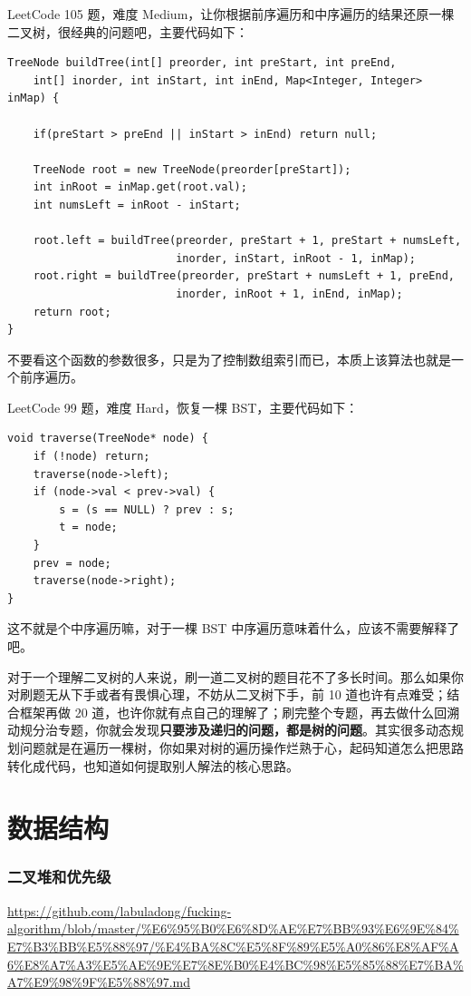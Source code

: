 \documentclass[12pt]{article}
\begin{document}
LeetCode 105 题，难度 Medium，让你根据前序遍历和中序遍历的结果还原一棵二叉树，很经典的问题吧，主要代码如下：
\begin{lstlisting}
TreeNode buildTree(int[] preorder, int preStart, int preEnd, 
    int[] inorder, int inStart, int inEnd, Map<Integer, Integer> inMap) {

    if(preStart > preEnd || inStart > inEnd) return null;

    TreeNode root = new TreeNode(preorder[preStart]);
    int inRoot = inMap.get(root.val);
    int numsLeft = inRoot - inStart;

    root.left = buildTree(preorder, preStart + 1, preStart + numsLeft, 
                          inorder, inStart, inRoot - 1, inMap);
    root.right = buildTree(preorder, preStart + numsLeft + 1, preEnd, 
                          inorder, inRoot + 1, inEnd, inMap);
    return root;
}
\end{lstlisting}
不要看这个函数的参数很多，只是为了控制数组索引而已，本质上该算法也就是一个前序遍历。

LeetCode 99 题，难度 Hard，恢复一棵 BST，主要代码如下：
\begin{lstlisting}
void traverse(TreeNode* node) {
    if (!node) return;
    traverse(node->left);
    if (node->val < prev->val) {
        s = (s == NULL) ? prev : s;
        t = node;
    }
    prev = node;
    traverse(node->right);
}
\end{lstlisting}
这不就是个中序遍历嘛，对于一棵 BST 中序遍历意味着什么，应该不需要解释了吧。

对于一个理解二叉树的人来说，刷一道二叉树的题目花不了多长时间。那么如果你对刷题无从下手或者有畏惧心理，不妨从二叉树下手，前 10 道也许有点难受；结合框架再做 20 道，也许你就有点自己的理解了；刷完整个专题，再去做什么回溯动规分治专题，你就会发现\textbf{只要涉及递归的问题，都是树的问题}。其实很多动态规划问题就是在遍历一棵树，你如果对树的遍历操作烂熟于心，起码知道怎么把思路转化成代码，也知道如何提取别人解法的核心思路。

\part{数据结构}
\section{二叉堆和优先级}
\url{https://github.com/labuladong/fucking-algorithm/blob/master/%E6%95%B0%E6%8D%AE%E7%BB%93%E6%9E%84%E7%B3%BB%E5%88%97/%E4%BA%8C%E5%8F%89%E5%A0%86%E8%AF%A6%E8%A7%A3%E5%AE%9E%E7%8E%B0%E4%BC%98%E5%85%88%E7%BA%A7%E9%98%9F%E5%88%97.md}
\end{document}
